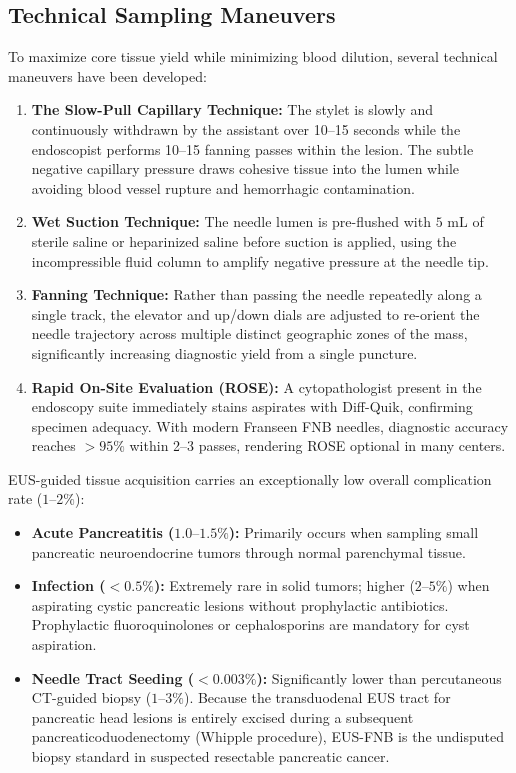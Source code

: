 \documentclass[11pt,a4paper]{article}
\begin{document}
\subsection{Technical Sampling Maneuvers}
To maximize core tissue yield while minimizing blood dilution, several technical maneuvers have been developed:
\begin{enumerate}
    \item \textbf{The Slow-Pull Capillary Technique:} The stylet is slowly and continuously withdrawn by the assistant over 10--15 seconds while the endoscopist performs 10--15 fanning passes within the lesion. The subtle negative capillary pressure draws cohesive tissue into the lumen while avoiding blood vessel rupture and hemorrhagic contamination.
    \item \textbf{Wet Suction Technique:} The needle lumen is pre-flushed with $5\text{ mL}$ of sterile saline or heparinized saline before suction is applied, using the incompressible fluid column to amplify negative pressure at the needle tip.
    \item \textbf{Fanning Technique:} Rather than passing the needle repeatedly along a single track, the elevator and up/down dials are adjusted to re-orient the needle trajectory across multiple distinct geographic zones of the mass, significantly increasing diagnostic yield from a single puncture.
    \item \textbf{Rapid On-Site Evaluation (ROSE):} A cytopathologist present in the endoscopy suite immediately stains aspirates with Diff-Quik, confirming specimen adequacy. With modern Franseen FNB needles, diagnostic accuracy reaches $> 95\%$ within 2--3 passes, rendering ROSE optional in many centers.
\end{enumerate}

\begin{clinicalpearl}
EUS-guided tissue acquisition carries an exceptionally low overall complication rate ($1\text{--}2\%$):
\begin{itemize}
    \item \textbf{Acute Pancreatitis ($1.0\text{--}1.5\%$):} Primarily occurs when sampling small pancreatic neuroendocrine tumors through normal parenchymal tissue.
    \item \textbf{Infection ($< 0.5\%$):} Extremely rare in solid tumors; higher ($2\text{--}5\%$) when aspirating cystic pancreatic lesions without prophylactic antibiotics. Prophylactic fluoroquinolones or cephalosporins are mandatory for cyst aspiration.
    \item \textbf{Needle Tract Seeding ($< 0.003\%$):} Significantly lower than percutaneous CT-guided biopsy ($1\text{--}3\%$). Because the transduodenal EUS tract for pancreatic head lesions is entirely excised during a subsequent pancreaticoduodenectomy (Whipple procedure), EUS-FNB is the undisputed biopsy standard in suspected resectable pancreatic cancer.
\end{itemize}
\end{clinicalpearl}
\end{document}
